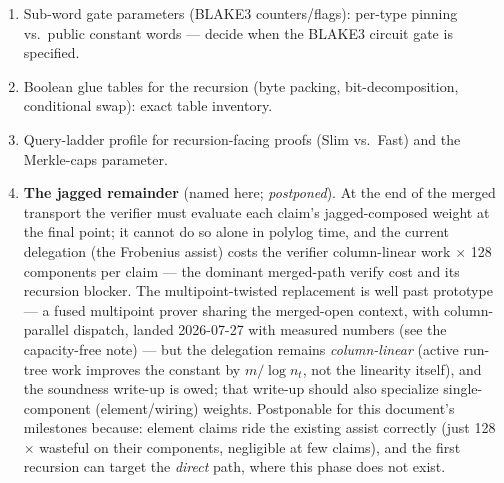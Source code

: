 \documentclass[11pt]{article}
\newcommand{\F}{\mathbb{F}}
\newcommand{\Ftwo}{\F_2}
\newcommand{\code}[1]{\texttt{#1}}
\theoremstyle{definition}
\begin{document}
\begin{enumerate}[nosep]
        A worked example of the cost asymmetry, kept because the rule
        generalizes: $\varphi_8$ is a field homomorphism, so the interpolation
        node set $V = \varphi_8(\{0..2^m-1\})$ is an $\Ftwo$-subspace and its
        vanishing polynomial $Z_V(X) = \prod_{s \in V}(X+s)$ is
        \emph{linearized} (verified:
        \code{phi8\_node\_sets\_have\_linearized\_vanishing\_polynomials}).
        Hence $L_i(z) = Z_V(z) / ((z + \varphi_8(i))\cdot d_i)$ with $d_i$
        constant --- one additive map and one inverse in place of an
        $O(\ell^2)$ product, collapsing $\sim$20k of the $\sim$46k
        multiplications, and $Z_V$ being $\Ftwo$-linear makes it \emph{free in
        the boolean class}. The right response is to fix the \emph{native}
        implementation, after which a tier-0 backend traces the good algorithm
        with no abstraction hiding the choice. The rule: an implementation
        being sub-millisecond and one-time natively says nothing about its
        shape when arithmetised.
  \item Sub-word gate parameters (BLAKE3 counters/flags): per-type pinning
        vs.\ public constant words --- decide when the BLAKE3 circuit gate
        is specified.
  \item Boolean glue tables for the recursion (byte packing,
        bit-decomposition, conditional swap): exact table inventory.
  \item Query-ladder profile for recursion-facing proofs (Slim vs.\ Fast)
        and the Merkle-caps parameter.
  \item \textbf{The jagged remainder} (named here; \emph{postponed}). At
        the end of the merged transport the verifier must evaluate each
        claim's jagged-composed weight at the final point; it cannot do so
        alone in polylog time, and the current delegation (the Frobenius
        assist) costs the verifier column-linear work $\times$ 128
        components per claim --- the dominant merged-path verify cost and
        its recursion blocker. The multipoint-twisted replacement is well
        past prototype --- a fused multipoint prover sharing the
        merged-open context, with column-parallel dispatch, landed
        2026-07-27 with measured numbers (see the capacity-free note) ---
        but the delegation remains \emph{column-linear} (active run-tree
        work improves the constant by $m/\log n_t$, not the linearity
        itself), and the soundness write-up is owed; that write-up should
        also specialize single-component (element/wiring) weights.
        Postponable for this document's milestones because:
        element claims ride the existing assist correctly (just 128$\times$
        wasteful on their components, negligible at few claims), and the
        first recursion can target the \emph{direct} path, where this
        phase does not exist.
\end{enumerate}
\end{document}
